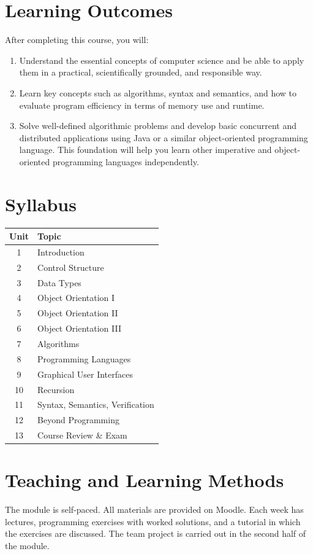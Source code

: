 \documentclass[11pt,a4paper]{article}
\begin{document}
\section{Learning Outcomes}
After completing this course, you will:
\begin{enumerate}[label=LO\arabic*.]
  \item Understand the essential concepts of computer science and be able to apply
        them in a practical, scientifically grounded, and responsible way.
  \item Learn key concepts such as algorithms, syntax and semantics, and how to
        evaluate program efficiency in terms of memory use and runtime.
  \item Solve well-defined algorithmic problems and develop basic concurrent and
        distributed applications using Java or a similar object-oriented programming
        language. This foundation will help you learn other imperative and
        object-oriented programming languages independently.
\end{enumerate}

\section{Syllabus}
\begin{tabularx}{\textwidth}{c X}
\toprule
\textbf{Unit} & \textbf{Topic} \\
\midrule
1  & Introduction \\
2  & Control Structure \\
3  & Data Types \\
4  & Object Orientation I \\
5  & Object Orientation II \\
6  & Object Orientation III \\
7  & Algorithms \\
8  & Programming Languages \\
9  & Graphical User Interfaces \\
10 & Recursion \\
11 & Syntax, Semantics, Verification \\
12 & Beyond Programming \\
13 & Course Review \& Exam \\
\bottomrule
\end{tabularx}

\section{Teaching and Learning Methods}
The module is self-paced. All materials are provided on Moodle. Each week has
lectures, programming exercises with worked solutions, and a tutorial in which the
exercises are discussed. The team project is carried out in the second half of the
module.
\end{document}
